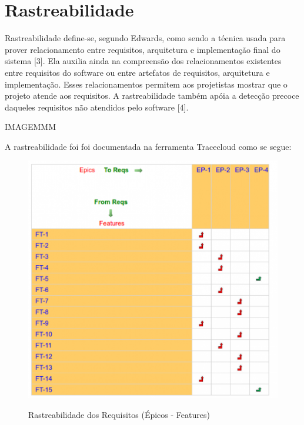 \section{Rastreabilidade}

Rastreabilidade define-se, segundo Edwards, como sendo a técnica usada para prover relacionamento entre requisitos, arquitetura e implementação final do sistema [3]. Ela auxilia ainda na compreensão dos relacionamentos existentes entre requisitos do software ou entre artefatos de requisitos, arquitetura e implementação. Esses relacionamentos permitem aos projetistas mostrar que o projeto atende aos requisitos. A rastreabilidade também apóia a detecção precoce daqueles requisitos não atendidos pelo software [4].

IMAGEMMM

A rastreabilidade foi foi documentada na ferramenta Tracecloud como se segue:

\FloatBarrier
\begin{figure}[!htpd]
		\centering
		\includegraphics[scale=0.4]{figuras/rast1}
		\label{img:rast1}
		\caption{Rastreabilidade dos Requisitos (Épicos - Features)}
\end{figure}

